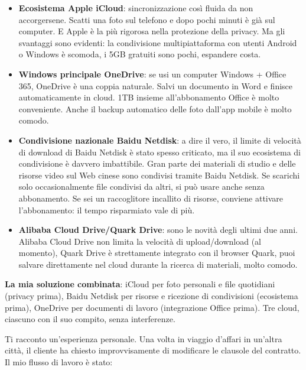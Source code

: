 \begin{itemize}
  \item \textbf{Ecosistema Apple iCloud}: sincronizzazione così fluida da non accorgersene. Scatti una foto sul telefono e dopo pochi minuti è già sul computer. E Apple è la più rigorosa nella protezione della privacy. Ma gli svantaggi sono evidenti: la condivisione multipiattaforma con utenti Android o Windows è scomoda, i 5GB gratuiti sono pochi, espandere costa.
  \item \textbf{Windows principale OneDrive}: se usi un computer Windows + Office 365, OneDrive è una coppia naturale. Salvi un documento in Word e finisce automaticamente in cloud. 1TB insieme all'abbonamento Office è molto conveniente. Anche il backup automatico delle foto dall'app mobile è molto comodo.
  \item \textbf{Condivisione nazionale Baidu Netdisk}: a dire il vero, il limite di velocità di download di Baidu Netdisk è stato spesso criticato, ma il suo ecosistema di condivisione è davvero imbattibile. Gran parte dei materiali di studio e delle risorse video sul Web cinese sono condivisi tramite Baidu Netdisk. Se scarichi solo occasionalmente file condivisi da altri, si può usare anche senza abbonamento. Se sei un raccoglitore incallito di risorse, conviene attivare l'abbonamento: il tempo risparmiato vale di più.
  \item \textbf{Alibaba Cloud Drive/Quark Drive}: sono le novità degli ultimi due anni. Alibaba Cloud Drive non limita la velocità di upload/download (al momento), Quark Drive è strettamente integrato con il browser Quark, puoi salvare direttamente nel cloud durante la ricerca di materiali, molto comodo.
\end{itemize}

\textbf{La mia soluzione combinata}: iCloud per foto personali e file quotidiani (privacy prima), Baidu Netdisk per risorse e ricezione di condivisioni (ecosistema prima), OneDrive per documenti di lavoro (integrazione Office prima). Tre cloud, ciascuno con il suo compito, senza interferenze.


Ti racconto un'esperienza personale. Una volta in viaggio d'affari in un'altra città, il cliente ha chiesto improvvisamente di modificare le clausole del contratto. Il mio flusso di lavoro è stato:

